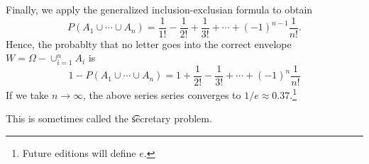 Finally, we apply the generalized inclusion-exclusian formula to obtain
\[
P(A_1 \cup \cdots \cup A_n) = \frac{1}{1!} - \frac{1}{2!} + \frac{1}{3!} + \cdots + (-1)^{n-1} \frac{1}{n!}.
\]
Hence, the probablty that no letter goes into the correct envelope $W = \Omega  - \cup_{i = 1}^{n} A_i$ is
\[
1 - P(A_1 \cup \cdots \cup A_n) = 1 + \frac{1}{2!} - \frac{1}{3!} + \cdots + (-1)^n\frac{1}{n!}
\]
If we take $n \to \infty$, the above series series converges to $1/e \approx 0.37$.\footnote{Future editions will define $e$.}

This is sometimes called the \t{secretary problem}.


\blankpage